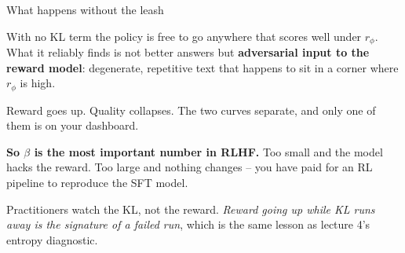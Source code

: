 \documentclass[aspectratio=169]{beamer}
\begin{document}
\begin{frame}{What happens without the leash}
  \begin{tcolorbox}[colback=armred!8, colframe=armred, boxrule=0.8pt, arc=2pt,
                    title={\textbf{Set $\beta = 0$ and the model finds the exploit}}]
    \small
    With no KL term the policy is free to go anywhere that scores well under $r_\phi$. What it
    reliably finds is not better answers but \textbf{adversarial input to the reward model}:
    degenerate, repetitive text that happens to sit in a corner where $r_\phi$ is high.

    \vskip 4pt
    Reward goes up. Quality collapses. The two curves separate, and only one of them is on your
    dashboard.
  \end{tcolorbox}

  \vskip 8pt
  \begin{tcolorbox}[colback=armorange!12, colframe=armorange, boxrule=0.6pt, arc=2pt]
    \small
    \textbf{So $\beta$ is the most important number in RLHF.} Too small and the model hacks the
    reward. Too large and nothing changes -- you have paid for an RL pipeline to reproduce the
    SFT model.

    \vskip 4pt
    Practitioners watch the KL, not the reward. \emph{Reward going up while KL runs away is the
    signature of a failed run}, which is the same lesson as lecture 4's entropy diagnostic.
  \end{tcolorbox}
\end{frame}
\end{document}

